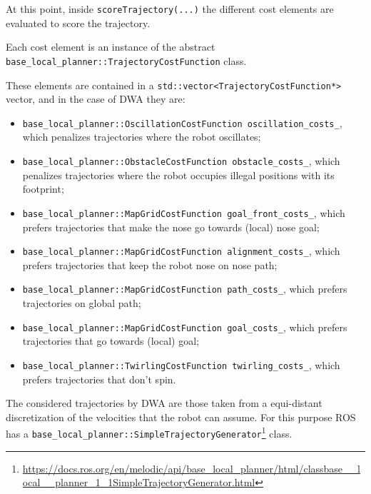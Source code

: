 \documentclass[11pt,a4paper]{article}
\begin{document}
At this point, inside \texttt{scoreTrajectory(...)} the different cost elements are evaluated to score the trajectory.

Each cost element is an instance of the abstract \texttt{base\_local\_planner::TrajectoryCostFunction} class.

These elements are contained in a \texttt{std::vector<TrajectoryCostFunction*>} vector, and in the case of DWA they are:
\begin{itemize}
 \item \texttt{base\_local\_planner::OscillationCostFunction oscillation\_costs\_}, which penalizes trajectories where the robot oscillates;
 \item \texttt{base\_local\_planner::ObstacleCostFunction obstacle\_costs\_}, which penalizes trajectories where the robot occupies illegal positions with its footprint;
 \item \texttt{base\_local\_planner::MapGridCostFunction goal\_front\_costs\_}, which prefers  trajectories that make the nose go towards (local) nose goal;
 \item \texttt{base\_local\_planner::MapGridCostFunction alignment\_costs\_}, which prefers trajectories that keep the robot nose on nose path;
 \item \texttt{base\_local\_planner::MapGridCostFunction path\_costs\_}, which prefers trajectories on global path;
 \item \texttt{base\_local\_planner::MapGridCostFunction goal\_costs\_}, which prefers trajectories that go towards (local) goal;
 \item \texttt{base\_local\_planner::TwirlingCostFunction twirling\_costs\_}, which prefers trajectories that don't spin.\\
\end{itemize}

The considered trajectories by DWA are those taken from a equi-distant discretization of the velocities that the robot can assume. For this purpose ROS has a \texttt{base\_local\_planner::SimpleTrajectoryGenerator}\footnote{\href{https://docs.ros.org/en/melodic/api/base\_local\_planner/html/classbase\_\_local\_\_planner\_1\_1SimpleTrajectoryGenerator.html}{https://docs.ros.org/en/melodic/api/base\_local\_planner/html/classbase\_\_local\_\_planner\_1\_1SimpleTrajectoryGenerator.html}} class.



\end{document}
